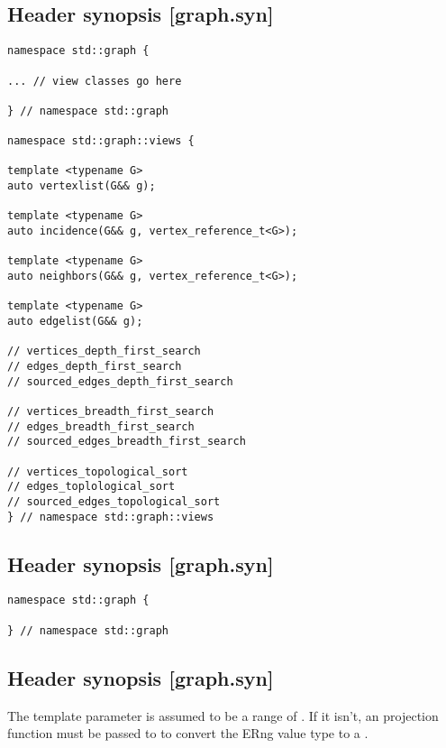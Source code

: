 
\subsection{Header  synopsis [graph.syn]}

\begin{lstlisting}
namespace std::graph {

... // view classes go here

} // namespace std::graph

namespace std::graph::views {

template <typename G>
auto vertexlist(G&& g);

template <typename G>
auto incidence(G&& g, vertex_reference_t<G>);

template <typename G>
auto neighbors(G&& g, vertex_reference_t<G>);

template <typename G>
auto edgelist(G&& g);

// vertices_depth_first_search
// edges_depth_first_search
// sourced_edges_depth_first_search

// vertices_breadth_first_search
// edges_breadth_first_search
// sourced_edges_breadth_first_search

// vertices_topological_sort
// edges_toplological_sort
// sourced_edges_topological_sort
} // namespace std::graph::views
\end{lstlisting}

\subsection{Header  synopsis [graph.syn]}

\begin{lstlisting}
namespace std::graph {

} // namespace std::graph
\end{lstlisting}

\subsection{Header  synopsis [graph.syn]}

The  template parameter is assumed to be a range of . If it isn't, an  projection function must be passed to to convert the ERng value type to a .

